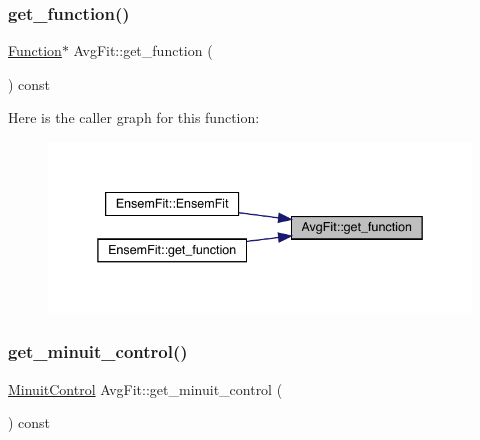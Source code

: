 \mbox{\label{classAvgFit_a40e757ad0dc9563c684491165bee9baa}} 
\subsubsection{\texorpdfstring{get\_function()}{get\_function()}\hspace{0.1cm}{\footnotesize\ttfamily [2/2]}}
{\footnotesize\ttfamily \mbox{\hyperlink{classFunction}{Function}}$\ast$ Avg\+Fit\+::get\+\_\+function (\begin{DoxyParamCaption}{ }\end{DoxyParamCaption}) const\hspace{0.3cm}{\ttfamily [inline]}}

Here is the caller graph for this function\+:
\nopagebreak
\begin{figure}[H]
\begin{center}
\leavevmode
\includegraphics[width=338pt]{d4/dfd/classAvgFit_a40e757ad0dc9563c684491165bee9baa_icgraph}
\end{center}
\end{figure}
\mbox{\label{classAvgFit_a2a1fb43d6a70a74e39d7d05de9fe5e5d}} 
\subsubsection{\texorpdfstring{get\_minuit\_control()}{get\_minuit\_control()}\hspace{0.1cm}{\footnotesize\ttfamily [1/2]}}
{\footnotesize\ttfamily \mbox{\hyperlink{structMinuitControl}{Minuit\+Control}} Avg\+Fit\+::get\+\_\+minuit\+\_\+control (\begin{DoxyParamCaption}{ }\end{DoxyParamCaption}) const\hspace{0.3cm}{\ttfamily [inline]}}


